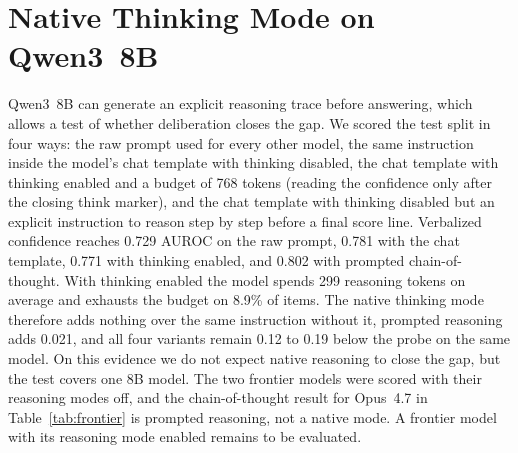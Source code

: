 \documentclass[acmsmall,screen,review]{acmart}
\begin{document}
\section{Native Thinking Mode on Qwen3~8B}
\label{sec:thinking_app}
Qwen3~8B can generate an explicit reasoning trace before answering, which allows a test of whether deliberation closes the gap. We scored the test split in four ways: the raw prompt used for every other model, the same instruction inside the model's chat template with thinking disabled, the chat template with thinking enabled and a budget of 768 tokens (reading the confidence only after the closing think marker), and the chat template with thinking disabled but an explicit instruction to reason step by step before a final score line. Verbalized confidence reaches 0.729 AUROC on the raw prompt, 0.781 with the chat template, 0.771 with thinking enabled, and 0.802 with prompted chain-of-thought. With thinking enabled the model spends 299 reasoning tokens on average and exhausts the budget on 8.9\% of items. The native thinking mode therefore adds nothing over the same instruction without it, prompted reasoning adds 0.021, and all four variants remain 0.12 to 0.19 below the probe on the same model. On this evidence we do not expect native reasoning to close the gap, but the test covers one 8B model. The two frontier models were scored with their reasoning modes off, and the chain-of-thought result for Opus~4.7 in Table~\ref{tab:frontier} is prompted reasoning, not a native mode. A frontier model with its reasoning mode enabled remains to be evaluated.
\end{document}
